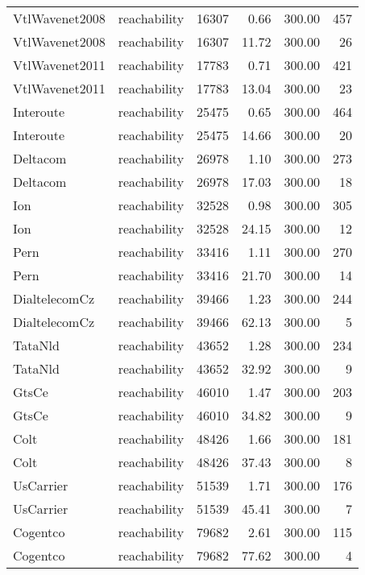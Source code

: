 \begin{tabular}{llrrrr}
VtlWavenet2008 & reachability & 16307 & 0.66 & 300.00 & 457 \\
VtlWavenet2008 & reachability & 16307 & 11.72 & 300.00 & 26 \\
VtlWavenet2011 & reachability & 17783 & 0.71 & 300.00 & 421 \\
VtlWavenet2011 & reachability & 17783 & 13.04 & 300.00 & 23 \\
Interoute & reachability & 25475 & 0.65 & 300.00 & 464 \\
Interoute & reachability & 25475 & 14.66 & 300.00 & 20 \\
Deltacom & reachability & 26978 & 1.10 & 300.00 & 273 \\
Deltacom & reachability & 26978 & 17.03 & 300.00 & 18 \\
Ion & reachability & 32528 & 0.98 & 300.00 & 305 \\
Ion & reachability & 32528 & 24.15 & 300.00 & 12 \\
Pern & reachability & 33416 & 1.11 & 300.00 & 270 \\
Pern & reachability & 33416 & 21.70 & 300.00 & 14 \\
DialtelecomCz & reachability & 39466 & 1.23 & 300.00 & 244 \\
DialtelecomCz & reachability & 39466 & 62.13 & 300.00 & 5 \\
TataNld & reachability & 43652 & 1.28 & 300.00 & 234 \\
TataNld & reachability & 43652 & 32.92 & 300.00 & 9 \\
GtsCe & reachability & 46010 & 1.47 & 300.00 & 203 \\
GtsCe & reachability & 46010 & 34.82 & 300.00 & 9 \\
Colt & reachability & 48426 & 1.66 & 300.00 & 181 \\
Colt & reachability & 48426 & 37.43 & 300.00 & 8 \\
UsCarrier & reachability & 51539 & 1.71 & 300.00 & 176 \\
UsCarrier & reachability & 51539 & 45.41 & 300.00 & 7 \\
Cogentco & reachability & 79682 & 2.61 & 300.00 & 115 \\
Cogentco & reachability & 79682 & 77.62 & 300.00 & 4 \\
\bottomrule
\end{tabular}
